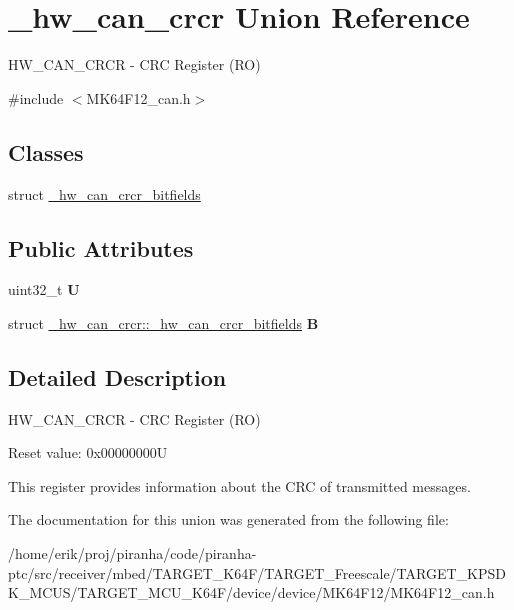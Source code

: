 \hypertarget{union__hw__can__crcr}{}\section{\+\_\+hw\+\_\+can\+\_\+crcr Union Reference}
\label{union__hw__can__crcr}


H\+W\+\_\+\+C\+A\+N\+\_\+\+C\+R\+CR -\/ C\+RC Register (RO)  




{\ttfamily \#include $<$M\+K64\+F12\+\_\+can.\+h$>$}

\subsection*{Classes}
\begin{DoxyCompactItemize}
\item 
struct \hyperlink{struct__hw__can__crcr_1_1__hw__can__crcr__bitfields}{\+\_\+hw\+\_\+can\+\_\+crcr\+\_\+bitfields}
\end{DoxyCompactItemize}
\subsection*{Public Attributes}
\begin{DoxyCompactItemize}
\item 
uint32\+\_\+t {\bfseries U}\hypertarget{union__hw__can__crcr_a218e988599e967dd0d068251dcccb9eb}{}\label{union__hw__can__crcr_a218e988599e967dd0d068251dcccb9eb}

\item 
struct \hyperlink{struct__hw__can__crcr_1_1__hw__can__crcr__bitfields}{\+\_\+hw\+\_\+can\+\_\+crcr\+::\+\_\+hw\+\_\+can\+\_\+crcr\+\_\+bitfields} {\bfseries B}\hypertarget{union__hw__can__crcr_a376de9261ba77e6afc886961a7bee82e}{}\label{union__hw__can__crcr_a376de9261ba77e6afc886961a7bee82e}

\end{DoxyCompactItemize}


\subsection{Detailed Description}
H\+W\+\_\+\+C\+A\+N\+\_\+\+C\+R\+CR -\/ C\+RC Register (RO) 

Reset value\+: 0x00000000U

This register provides information about the C\+RC of transmitted messages. 

The documentation for this union was generated from the following file\+:\begin{DoxyCompactItemize}
\item 
/home/erik/proj/piranha/code/piranha-\/ptc/src/receiver/mbed/\+T\+A\+R\+G\+E\+T\+\_\+\+K64\+F/\+T\+A\+R\+G\+E\+T\+\_\+\+Freescale/\+T\+A\+R\+G\+E\+T\+\_\+\+K\+P\+S\+D\+K\+\_\+\+M\+C\+U\+S/\+T\+A\+R\+G\+E\+T\+\_\+\+M\+C\+U\+\_\+\+K64\+F/device/device/\+M\+K64\+F12/M\+K64\+F12\+\_\+can.\+h\end{DoxyCompactItemize}
